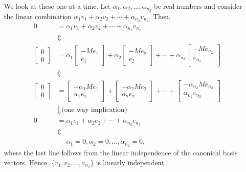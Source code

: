 We look at these one at a time. Let $\alpha_1, \alpha_2, \ldots, \alpha_{n_2}$ be real numbers and consider the linear combination $\alpha_1 v_1 + \alpha_2 v_2 + \cdots + \alpha_{n_2} v_{n_2}$. Then, 
\begin{equation}
\label{eq:BasisLeadingToNullspace04}
\begin{aligned}
0 & =\alpha_1 v_1 + \alpha_2 v_2 + \cdots + \alpha_{n_2} v_{n_2}\\
& \Updownarrow \\
\left[\begin{array}{c}
    0 \\ 0
\end{array}\right] & = \alpha_1 \left[\begin{array}{c}
    -Me_1 \\ e_1
\end{array}\right] + \alpha_2 \left[\begin{array}{c}
    -Me_2 \\ e_2
\end{array}\right] + \cdots + \alpha_{n_2} \left[\begin{array}{c}
    -Me_{n_2} \\ e_{n_2}\\
\end{array}\right] \\
& \Updownarrow \\
\left[\begin{array}{c}
    0 \\ 0
\end{array}\right] &=  \left[\begin{array}{c}
    -\alpha_1 Me_1 \\\alpha_1 e_1
\end{array}\right] +  \left[\begin{array}{c}
    -\alpha_2Me_2 \\\alpha_2 e_2
\end{array}\right] + \cdots +  \left[\begin{array}{c}
    -\alpha_{n_2}Me_{n_2} \\\alpha_{n_2} e_{n_2}\\
\end{array}\right]\\
& \Downarrow \text{(one way implication)} \\
0&=\alpha_1 e_1 + \alpha_2 e_2 + \cdots + \alpha_{n_2} e_{n_2}\\
& \Updownarrow \\
& ~~~~~~\alpha_1 =0, \alpha_2=0, \ldots, \alpha_{n_2}=0,
\end{aligned}
\end{equation}
where the last line follows from the linear independence of the canonical basis vectors.
Hence, $\{ v_1, v_2, \ldots, v_{n_2}\}$ is linearly independent.\\

